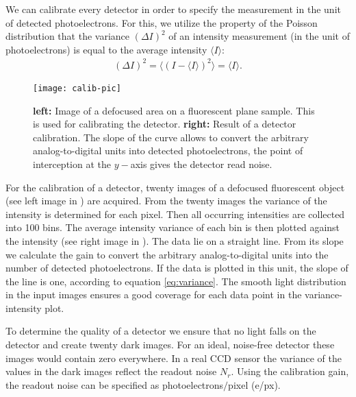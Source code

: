 

We can calibrate every detector in order to specify the measurement in
the unit of detected photoelectrons. For this, we utilize the property
of the Poisson distribution that the variance $(\Delta I)^2$ of an
intensity measurement (in the unit of photoelectrons) is equal to the
average intensity $\langle I\rangle$:
\begin{align}
\label{eq:variance}
  (\Delta I)^2 = \langle(I - \langle I \rangle) ^2\rangle = \langle I\rangle.
\end{align}
\newcommand{\comment}[2]{#2}
\begin{figure}
  \centering
  \texttt{[image: calib-pic]}
  \caption{{\bf left:} Image of a defocused area on a fluorescent
    plane sample. This is used for calibrating the detector. {\bf
      right:} Result of a detector calibration. The slope of the curve
    allows to convert the arbitrary analog-to-digital units into
    detected photoelectrons, the point of interception at the $y-$axis
    gives the detector read noise.}
  \label{fig:shot-noise}
\end{figure}
For the calibration of a detector, twenty images of a  defocused fluorescent object (see left image in
) are acquired. From the twenty images the
variance of the intensity is determined for each pixel. Then all
occurring intensities are collected into 100 bins. The average
intensity variance of each bin is then plotted against the intensity
(see right image in ). The data lie on a
straight line. From its slope we calculate the gain to convert the
arbitrary analog-to-digital units into the number of detected
photoelectrons. If the data is plotted in this unit, the slope of the
line is one, according to equation \eqref{eq:variance}. The smooth
light distribution in the input images ensures a good coverage for
each data point in the variance-intensity plot. 

\comment{ %
\jpginput{10cm}{calib-pic}{Image of a defocused area on a fluorescent
  plane sample.}}

To determine the quality of a detector we 
ensure that no light falls on the detector and create twenty dark
images.  For an ideal, noise-free detector these images would contain
zero everywhere. In a real CCD sensor the variance of the values in
the dark images reflect the readout noise $N_r$. Using the calibration
gain, the readout noise can be specified as photoelectrons$/$pixel
(\unit[]{e/px}).

